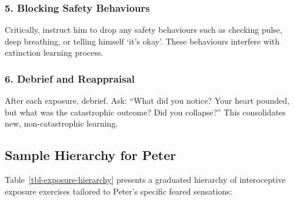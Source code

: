 \documentclass[
  american,
  11pt,
  11pt,
  letterpaper,
  onecolumn]{article}
\begin{document}
\subsubsection{5. Blocking Safety
Behaviours}\label{blocking-safety-behaviours}

Critically, instruct him to drop any safety behaviours such as checking
pulse, deep breathing, or telling himself `it's okay'. These behaviours
interfere with extinction learning process.

\subsubsection{6. Debrief and
Reappraisal}\label{debrief-and-reappraisal}

After each exposure, debrief. Ask: ``What did you notice? Your heart
pounded, but what was the catastrophic outcome? Did you collapse?'' This
consolidates new, non-catastrophic learning.

\subsection{Sample Hierarchy for
Peter}\label{sample-hierarchy-for-peter}

Table~\ref{tbl-exposure-hierarchy} presents a graduated hierarchy of
interoceptive exposure exercises tailored to Peter's specific feared
sensations:
\end{document}
